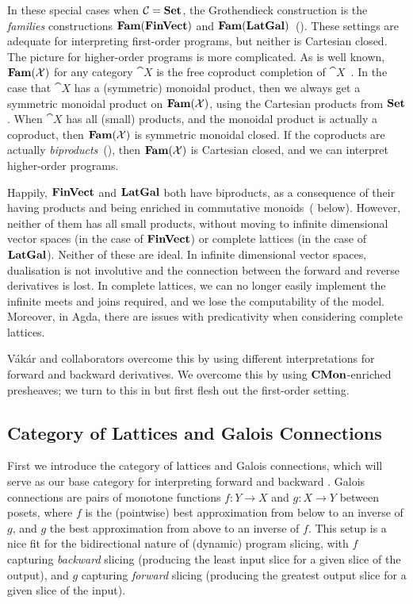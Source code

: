 In these special cases when $\mathcal{C} = \mathbf{Set}$, the Grothendieck construction is the {\em families} constructions $\mathbf{Fam}(\mathbf{FinVect})$ and $\mathbf{Fam}(\mathbf{LatGal})$~(). These settings are adequate for interpreting first-order programs, but neither is Cartesian closed. The picture for higher-order programs is more complicated. As is well known, $\mathbf{Fam}(\mathcal{X})$ for any category $\cat{X}$ is the free coproduct completion of $\cat{X}$~\cite{lawvere63}. In the case that $\cat{X}$ has a (symmetric) monoidal product, then we always get a symmetric monoidal product on $\mathbf{Fam}(\mathcal{X})$, using the Cartesian products from $\mathbf{Set}$. When $\cat{X}$ has all (small) products, and the monoidal product is actually a coproduct, then $\mathbf{Fam}(\mathcal{X})$ is symmetric monoidal closed. If the coproducts are actually {\em biproducts}~(), then $\mathbf{Fam}(\mathcal{X})$ is Cartesian closed, and we can interpret higher-order programs.

Happily, $\mathbf{FinVect}$ and $\mathbf{LatGal}$ both have biproducts, as a consequence of their having products and being enriched in commutative monoids~( below). However, neither of them has all small products, without moving to infinite dimensional vector spaces (in the case of $\mathbf{FinVect}$) or complete lattices (in the case of $\mathbf{LatGal}$). Neither of these are ideal. In infinite dimensional vector spaces, dualisation is not involutive and the connection between the forward and reverse derivatives is lost. In complete lattices, we can no longer easily implement the infinite meets and joins required, and we lose the computability of the model. Moreover, in Agda, there are issues with predicativity when considering complete lattices. 

Vákár and collaborators overcome this by using different interpretations for forward and backward derivatives. We overcome this by using $\mathbf{CMon}$-enriched presheaves; we turn to this in  but first flesh out the first-order setting.

\subsection{Category of Lattices and Galois Connections}

First we introduce the category of lattices and Galois connections, which will serve as our base category for
interpreting forward and backward \GPS. Galois connections are pairs of monotone functions $f: Y \to
X$ and $g: X \to Y$ between posets, where $f$ is the (pointwise) best approximation from below to an inverse
of $g$, and $g$ the best approximation from above to an inverse of $f$. This setup is a nice fit for the
bidirectional nature of (dynamic) program slicing, with $f$ capturing \emph{backward} slicing (producing the
least input slice for a given slice of the output), and $g$ capturing \emph{forward} slicing (producing the
greatest output slice for a given slice of the input).

